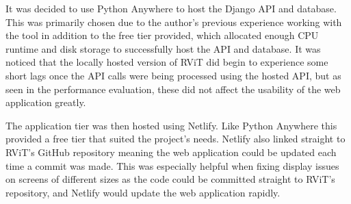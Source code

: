 \documentclass[l4proj.tex]{subfiles}
\begin{document}
It was decided to use Python Anywhere to host the Django API and database. This was primarily chosen due to the author's previous experience working with the tool in addition to the free tier provided, which allocated enough CPU runtime and disk storage to successfully host the API and database. It was noticed that the locally hosted version of RViT did begin to experience some short lags once the API calls were being processed using the hosted API, but as seen in the performance evaluation, these did not affect the usability of the web application greatly.

The application tier was then hosted using Netlify. Like Python Anywhere this provided a free tier that suited the project's needs. Netlify also linked straight to RViT's GitHub repository meaning the web application could be updated each time a commit was made. This was especially helpful when fixing display issues on screens of different sizes as the code could be committed straight to RViT's repository, and Netlify would update the web application rapidly.
\end{document}
